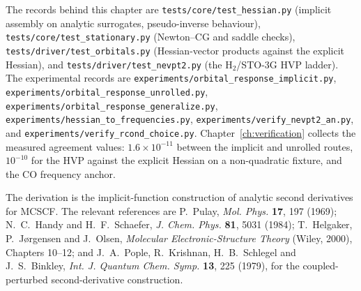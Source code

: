 {\raggedright
The records behind this chapter are
\texttt{tests/core/test\_hessian.py} (implicit assembly on analytic
surrogates, pseudo-inverse behaviour),
\texttt{tests/core/test\_stationary.py} (Newton--CG and saddle checks),
\texttt{tests/driver/test\_orbitals.py} (Hessian-vector products
against the explicit Hessian), and
\texttt{tests/driver/test\_nevpt2.py} (the H$_2$/STO-3G HVP ladder).
The experimental records are
\texttt{experiments/orbital\_response\_implicit.py},
\texttt{experiments/orbital\_response\_unrolled.py},
\texttt{experiments/orbital\_response\_generalize.py},
\texttt{experiments/hessian\_to\_frequencies.py},
\texttt{experiments/verify\_nevpt2\_an.py}, and
\texttt{experiments/verify\_rcond\_choice.py}.  Chapter~\ref{ch:verification}
collects the measured agreement values: $1.6\times10^{-11}$ between
the implicit and unrolled routes, $10^{-10}$ for the HVP against the
explicit Hessian on a non-quadratic fixture, and the CO frequency
anchor.\par}

The derivation is the implicit-function construction of analytic
second derivatives for MCSCF.  The relevant references are
P.~Pulay, \emph{Mol. Phys.} \textbf{17}, 197 (1969); N.~C.~Handy and
H.~F.~Schaefer, \emph{J. Chem. Phys.} \textbf{81}, 5031 (1984);
T.~Helgaker, P.~J{\o}rgensen and J.~Olsen, \emph{Molecular
Electronic-Structure Theory} (Wiley, 2000), Chapters 10--12; and
J.~A.~Pople, R.~Krishnan, H.~B.~Schlegel and J.~S.~Binkley,
\emph{Int. J. Quantum Chem. Symp.} \textbf{13}, 225 (1979), for the
coupled-perturbed second-derivative construction.
